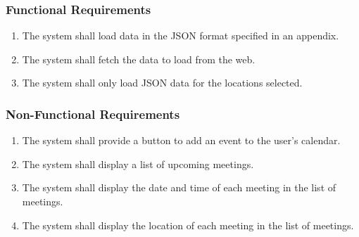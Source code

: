 \documentclass{beamer}
\newcommand{\requirement}[1]{The system shall #1.}
\begin{document}
\begin{frame}
  \frametitle{Functional Requirements}
  \begin{enumerate}
    \item \requirement{load data in the JSON format specified in
      an appendix}
    \item \requirement{fetch the data to load from the web}
    \item \requirement{only load JSON data for the locations selected}
  \end{enumerate}
\end{frame}

\begin{frame}
  \frametitle{Non-Functional Requirements}
  \begin{enumerate}
    \item \requirement{provide a button to add an event to the user's calendar}
    \item \requirement{display a list of upcoming meetings}
    \item \requirement{display the date and time of each meeting in the list of meetings}
    \item \requirement{display the location of each meeting in the list of meetings}
  \end{enumerate}
\end{frame}
\end{document}
